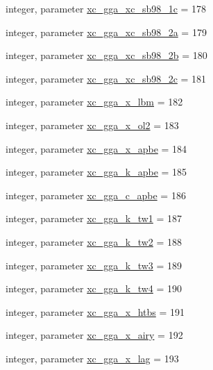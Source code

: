 \begin{DoxyCompactItemize}
integer, parameter \hyperlink{classlibxc__funcs__m_a6f9106be4a5b0c87db81f256f493c553}{xc\-\_\-gga\-\_\-xc\-\_\-sb98\-\_\-1c} = 178
\item 
integer, parameter \hyperlink{classlibxc__funcs__m_aaf05c9feb7e4beab8cc92011ed1b9643}{xc\-\_\-gga\-\_\-xc\-\_\-sb98\-\_\-2a} = 179
\item 
integer, parameter \hyperlink{classlibxc__funcs__m_a63bde89a0f2e57d874e29eab34ff2ea3}{xc\-\_\-gga\-\_\-xc\-\_\-sb98\-\_\-2b} = 180
\item 
integer, parameter \hyperlink{classlibxc__funcs__m_a043acb3ab7c5822422a4d3604384adb8}{xc\-\_\-gga\-\_\-xc\-\_\-sb98\-\_\-2c} = 181
\item 
integer, parameter \hyperlink{classlibxc__funcs__m_afb50e83f04377b5189f6ca058b32d753}{xc\-\_\-gga\-\_\-x\-\_\-lbm} = 182
\item 
integer, parameter \hyperlink{classlibxc__funcs__m_aeed8c201fee998f6efb1b57b711584a0}{xc\-\_\-gga\-\_\-x\-\_\-ol2} = 183
\item 
integer, parameter \hyperlink{classlibxc__funcs__m_ad13a9db7e3ad1194e24f0e75f667edac}{xc\-\_\-gga\-\_\-x\-\_\-apbe} = 184
\item 
integer, parameter \hyperlink{classlibxc__funcs__m_a062cd79e8c0b0d5e71e262bd2a3392f0}{xc\-\_\-gga\-\_\-k\-\_\-apbe} = 185
\item 
integer, parameter \hyperlink{classlibxc__funcs__m_a7c4d808330074f7ffaafe1ae4f2bd7d6}{xc\-\_\-gga\-\_\-c\-\_\-apbe} = 186
\item 
integer, parameter \hyperlink{classlibxc__funcs__m_a762e8a0bffded21d87ee4c507355bf19}{xc\-\_\-gga\-\_\-k\-\_\-tw1} = 187
\item 
integer, parameter \hyperlink{classlibxc__funcs__m_a774d83488fa29f8dca56f41c8bb3f83b}{xc\-\_\-gga\-\_\-k\-\_\-tw2} = 188
\item 
integer, parameter \hyperlink{classlibxc__funcs__m_a45c685fc7d4aa086c1dc0f301b223d2d}{xc\-\_\-gga\-\_\-k\-\_\-tw3} = 189
\item 
integer, parameter \hyperlink{classlibxc__funcs__m_ac325b938c0dca47c971d71e4e4c5e956}{xc\-\_\-gga\-\_\-k\-\_\-tw4} = 190
\item 
integer, parameter \hyperlink{classlibxc__funcs__m_add99fac9338123a0c24de848a57e563f}{xc\-\_\-gga\-\_\-x\-\_\-htbs} = 191
\item 
integer, parameter \hyperlink{classlibxc__funcs__m_a176badabd1f8c45f5532a356eff0af3f}{xc\-\_\-gga\-\_\-x\-\_\-airy} = 192
\item 
integer, parameter \hyperlink{classlibxc__funcs__m_a8c6afefb222cc8fd2e283494641e2e67}{xc\-\_\-gga\-\_\-x\-\_\-lag} = 193

\end{DoxyCompactItemize}
